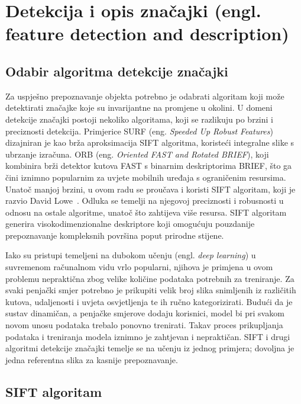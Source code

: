 \section{Detekcija i opis značajki (engl. feature detection and description)}

\subsection{Odabir algoritma detekcije značajki}

Za uspješno prepoznavanje objekta potrebno je odabrati algoritam koji može detektirati značajke koje su invarijantne na promjene u okolini. U domeni detekcije značajki postoji nekoliko algoritama, koji se razlikuju po brzini i preciznosti detekcija. Primjerice SURF (eng. \textit{Speeded Up Robust Features}) dizajniran je kao brža aproksimacija SIFT algoritma, koristeći integralne slike s ubrzanje izračuna. ORB (eng. \textit{Oriented FAST and Rotated BRIEF}), koji kombinira brži detektor kutova FAST s binarnim deskriptorima BRIEF, što ga čini iznimno popularnim za uvjete mobilnih uređaja s ograničenim resursima. Unatoč manjoj brzini, u ovom radu se proučava i koristi SIFT algoritam, koji je razvio David Lowe~\cite{lowe2004sift}. Odluka se temelji na njegovoj preciznosti i robusnosti u odnosu na ostale algoritme, unatoč što zahtijeva više resursa. SIFT algoritam generira visokodimenzionalne deskriptore koji omogućuju pouzdanije prepoznavanje kompleksnih površina poput prirodne stijene. 

Iako su pristupi temeljeni na dubokom učenju (engl. \textit{deep learning}) u suvremenom računalnom vidu vrlo popularni, njihova je primjena u ovom problemu nepraktična zbog velike količine podataka potrebnih za treniranje. Za svaki penjački smjer potrebno je prikupiti velik broj slika snimljenih iz različitih kutova, udaljenosti i uvjeta osvjetljenja te ih ručno kategorizirati. Budući da je sustav dinamičan, a penjačke smjerove dodaju korisnici, model bi pri svakom novom unosu podataka trebalo ponovno trenirati. Takav proces prikupljanja podataka i treniranja modela iznimno je zahtjevan i nepraktičan. SIFT i drugi algoritmi detekcije značajki temelje se na učenju iz jednog primjera; dovoljna je jedna referentna slika za kasnije prepoznavanje. 

\subsection{SIFT algoritam}

